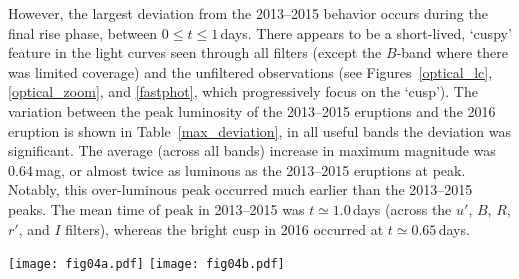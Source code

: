 \documentclass[twocolumn,tighten]{aastex6}
\def\novak{{M31N\,2008-12a}}
\newcommand{\othreek}{\citetalias{2016ApJ...833..149D}}
\begin{document}
However, the largest deviation from the 2013--2015 behavior occurs during the final rise phase, between $0\leq t\leq1$\,days.  There appears to be a short-lived, `cuspy' feature in the light curves seen through all filters (except the $B$-band where there was limited coverage) and the unfiltered observations (see Figures~\ref{optical_lc}, \ref{optical_zoom}, and \ref{fastphot}, which progressively focus on the `cusp').  The variation between the peak luminosity of the 2013--2015 eruptions and the 2016 eruption is shown in Table~\ref{max_deviation}, in all useful bands the deviation was significant.  The average (across all bands) increase in maximum magnitude was 0.64\,mag, or almost twice as luminous as the 2013--2015 eruptions at peak.  Notably, this over-luminous peak occurred much earlier than the 2013--2015 peaks.  The mean time of peak in 2013--2015 was $t\simeq1.0$\,days (across the $u'$, $B$, $R$, $r'$, and $I$ filters), whereas the bright cusp in 2016 occurred at $t\simeq0.65$\,days.  

\begin{figure*}
\texttt{[image: fig04a.pdf]}\hfill
\texttt{[image: fig04b.pdf]}
\caption{Broad-band and unfiltered photometry of the \novak\ `cusp'. In both sub-plots, the blue points note the combined $r'$-band photometry from the 2013, 2014, and 2015 eruptions, with the solid line showing the template 2013--2015 $r'$-band light curve and associated uncertainties (see \othreek).  {\bf Left:} Broad-band photometry of the `cusp', of the 2016 eruption of \novak.  Red points $r'$-band, magenta points $g'$-band, and the black points are $V$-band.\label{fastphot} {\bf Right:} Here we show a comparison between the {\it unfiltered} photometry of the 2010 (red) and 2016 (black) eruptions of \novak, the black stars indicate photometry of the 2016 eruption with no computed uncertainties.\label{2010comp}}
\end{figure*}
\end{document}
